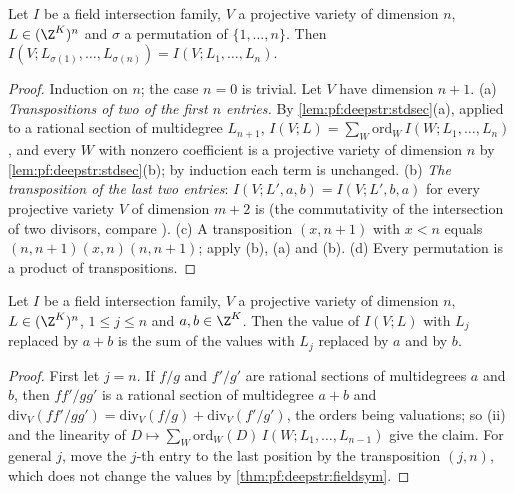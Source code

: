 \begin{theorem}[Symmetry]\label{thm:pf:deepstr:fieldsym}
Let $I$ be a field intersection family, $V$ a projective variety of dimension $n$, $L\in(\Z^K)^n$ and $\sigma$ a
permutation of $\{1,\dots,n\}$. Then $I(V;L_{\sigma(1)},\dots,L_{\sigma(n)})=I(V;L_1,\dots,L_n)$.
\end{theorem}

\begin{proof}
Induction on $n$; the case $n=0$ is trivial. Let $V$ have dimension $n+1$. (a) \emph{Transpositions of two
of the first $n$ entries.} By \cref{lem:pf:deepstr:stdsec}(a), applied to a rational section of multidegree
$L_{n+1}$, $I(V;L)=\sum_W\mathrm{ord}_W\,I(W;L_1,\dots,L_n)$, and every $W$ with nonzero coefficient is a projective
variety of dimension $n$ by \cref{lem:pf:deepstr:stdsec}(b); by induction each term is unchanged.
(b) \emph{The transposition of the last two entries}: $I(V;L',a,b)=I(V;L',b,a)$ for every projective variety
$V$ of dimension $m+2$ is  (the
commutativity of the intersection of two divisors, compare \cite[Thm.~2.4]{Fulton1998}). (c) A transposition
$(x,n+1)$ with $x<n$ equals $(n,n+1)(x,n)(n,n+1)$; apply (b), (a) and (b). (d) Every permutation is a
product of transpositions.
\end{proof}

\begin{theorem}[Multilinearity]\label{thm:pf:deepstr:fieldmultilin}
Let $I$ be a field intersection family, $V$ a projective variety of dimension $n$, $L\in(\Z^K)^n$, $1\le j\le n$ and
$a,b\in\Z^K$. Then the value of $I(V;L)$ with $L_j$ replaced by $a+b$ is the sum of the values with $L_j$ replaced
by $a$ and by $b$.
\end{theorem}

\begin{proof}
First let $j=n$. If $f/g$ and $f'/g'$ are rational sections of multidegrees $a$ and $b$, then $ff'/gg'$ is a
rational section of multidegree $a+b$ and $\mathrm{div}_V(ff'/gg')=\mathrm{div}_V(f/g)+\mathrm{div}_V(f'/g')$, the orders
being valuations; so (ii) and the linearity of $D\mapsto\sum_W\mathrm{ord}_W(D)\,I(W;L_1,\dots,L_{n-1})$ give the claim.
For general $j$, move the $j$-th entry to the last position by the transposition $(j,n)$, which does not
change the values by \cref{thm:pf:deepstr:fieldsym}.
\end{proof}

